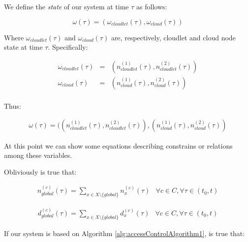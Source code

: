 \documentclass[10pt,a4paper]{article}
\begin{document}
We define the \textit{state} of our system at time $\tau$ as follows:

\begin{equation}
\omega(\tau) = (\omega_{cloudlet}(\tau),\omega_{cloud}(\tau))
\end{equation}

Where $\omega_{cloudlet}(\tau)$ and $\omega_{cloud}(\tau)$ are, respectively, cloudlet and cloud node state at time $\tau$. Specifically:

\begin{equation}
\begin{array} {rcl} 
\omega_{cloudlet}(\tau) & = & (n_{cloudlet}^{(1)}(\tau),n_{cloudlet}^{(2)}(\tau)) \\
\omega_{cloud}(\tau) & = & (n_{cloud}^{(1)}(\tau),n_{cloud}^{(2)}(\tau)) \\
\end{array}
\end{equation}

Thus:

\begin{equation}
\begin{array} {rcl} 
\omega(\tau) = ((n_{cloudlet}^{(1)}(\tau),n_{cloudlet}^{(2)}(\tau)),(n_{cloud}^{(1)}(\tau),n_{cloud}^{(2)}(\tau))
\end{array}
\end{equation}

At this point we can show some equations describing constrains or relations among these variables.

Obliviously is true that:

\begin{equation}
\begin{array} {lr} 
\displaystyle n_{global}^{(c)}(\tau) = \sum_{x \in X \setminus \lbrace global \rbrace } n_x^{(c)}(\tau) & \forall c \in C, \forall \tau \in (t_0, t)
\end{array}
\end{equation}

\begin{equation}
\begin{array} {lr} 
\displaystyle d_{global}^{(c)}(\tau) = \sum_{x \in X \setminus \lbrace global \rbrace } d_x^{(c)}(\tau) & \forall c \in C, \forall \tau \in (t_0, t)
\end{array}
\end{equation}

If our system is based on Algorithm \ref{alg:accessControlAlgorithm1}, is true that:
\end{document}
